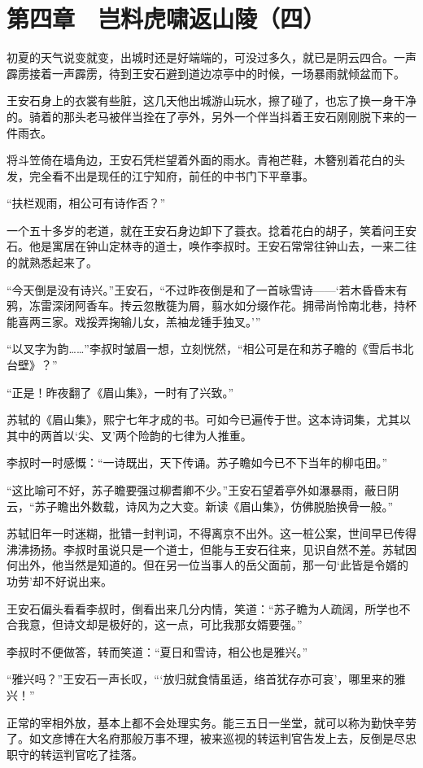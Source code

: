 \section{第四章　岂料虎啸返山陵（四）}

初夏的天气说变就变，出城时还是好端端的，可没过多久，就已是阴云四合。一声霹雳接着一声霹雳，待到王安石避到道边凉亭中的时候，一场暴雨就倾盆而下。

王安石身上的衣裳有些脏，这几天他出城游山玩水，擦了碰了，也忘了换一身干净的。骑着的那头老马被伴当拴在了亭外，另外一个伴当抖着王安石刚刚脱下来的一件雨衣。

将斗笠倚在墙角边，王安石凭栏望着外面的雨水。青袍芒鞋，木簪别着花白的头发，完全看不出是现任的江宁知府，前任的中书门下平章事。

“扶栏观雨，相公可有诗作否？”

一个五十多岁的老道，就在王安石身边卸下了蓑衣。捻着花白的胡子，笑着问王安石。他是寓居在钟山定林寺的道士，唤作李叔时。王安石常常往钟山去，一来二往的就熟悉起来了。

“今天倒是没有诗兴。”王安石，“不过昨夜倒是和了一首咏雪诗——‘若木昏昏末有鸦，冻雷深闭阿香车。抟云忽散簁为屑，翦水如分缀作花。拥帚尚怜南北巷，持杯能喜两三家。戏挼弄掬输儿女，羔袖龙锺手独叉。’”

“以叉字为韵……”李叔时皱眉一想，立刻恍然，“相公可是在和苏子瞻的《雪后书北台壁》？”

“正是！昨夜翻了《眉山集》，一时有了兴致。”

苏轼的《眉山集》，熙宁七年才成的书。可如今已遍传于世。这本诗词集，尤其以其中的两首以‘尖、叉’两个险韵的七律为人推重。

李叔时一时感慨：“一诗既出，天下传诵。苏子瞻如今已不下当年的柳屯田。”

“这比喻可不好，苏子瞻要强过柳耆卿不少。”王安石望着亭外如瀑暴雨，蔽日阴云，“苏子瞻出外数载，诗风为之大变。新读《眉山集》，仿佛脱胎换骨一般。”

苏轼旧年一时迷糊，批错一封判词，不得离京不出外。这一桩公案，世间早已传得沸沸扬扬。李叔时虽说只是一个道士，但能与王安石往来，见识自然不差。苏轼因何出外，他当然是知道的。但在另一位当事人的岳父面前，那一句‘此皆是令婿的功劳’却不好说出来。

王安石偏头看看李叔时，倒看出来几分内情，笑道：“苏子瞻为人疏阔，所学也不合我意，但诗文却是极好的，这一点，可比我那女婿要强。”

李叔时不便做答，转而笑道：“夏日和雪诗，相公也是雅兴。”

“雅兴吗？”王安石一声长叹，“‘放归就食情虽适，络首犹存亦可哀’，哪里来的雅兴！”

正常的宰相外放，基本上都不会处理实务。能三五日一坐堂，就可以称为勤快辛劳了。如文彦博在大名府那般万事不理，被来巡视的转运判官告发上去，反倒是尽忠职守的转运判官吃了挂落。

